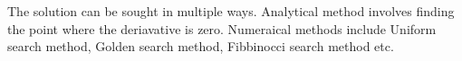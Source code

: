 \documentclass[10pt,a4paper]{article}
\begin{document}
 \par The solution can be sought in multiple ways. Analytical method involves finding the point where the deriavative is zero. Numeraical methods include Uniform search method, Golden search method, Fibbinocci search method etc.
 
\end{document}

